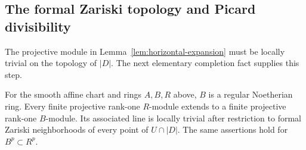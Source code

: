 \subsection{The formal Zariski topology and Picard divisibility}

The projective module in Lemma~\ref{lem:horizontal-expansion}
must be locally trivial on the topology of \(|D|\).  The next
elementary completion fact supplies this step.

\begin{lemma}
\label{lem:formal-line-extension}
For the smooth affine chart and rings \(A,B,R\) above,
\(B\) is a regular Noetherian ring.  Every finite projective
rank-one \(R\)-module extends to a finite projective rank-one
\(B\)-module.  Its associated line is locally trivial after
restriction to formal Zariski neighborhoods of every point of
\(U\cap|D|\).  The same assertions hold for \(B^p\subset R^p\).
\end{lemma}


